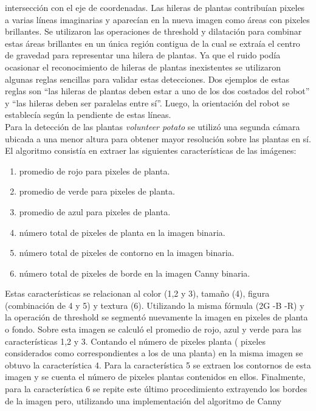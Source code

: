 	intersección con el eje de coordenadas. Las hileras de plantas 
	contribuían pixeles a varias líneas imaginarias y aparecían en la 
	nueva imagen como áreas con pixeles brillantes. Se utilizaron las 
	operaciones de threshold y dilatación para combinar estas áreas 
	brillantes en un única región contigua de la cual se 
	extraía el centro de gravedad para representar una hilera de 
	plantas. Ya que el ruido podía ocasionar el reconocimiento de 
	hileras de plantas inexistentes se utilizaron algunas reglas 
	sencillas para validar estas detecciones. Dos ejemplos de estas 
	reglas son ``las hileras de plantas deben estar a uno de los dos 
	costados del robot'' y ``las hileras deben ser paralelas entre sí''.
	Luego, la orientación del robot se establecía según la pendiente de 
	estas líneas.\\
	\indent Para la detección de las plantas \emph{volunteer potato} se 
	utilizó una segunda cámara ubicada a una menor altura para obtener 
	mayor resolución sobre las plantas en sí. El algoritmo consistía en 
	extraer las siguientes características de las imágenes: 
	\begin{enumerate}
	\item{promedio de rojo para pixeles de planta.}
	\item{promedio de verde para 
	pixeles de planta.}
	\item{promedio de azul para pixeles de planta.}
	\item{número total de pixeles de planta en la imagen binaria.}
	\item{número total de pixeles de contorno en la imagen binaria.}
	\item{número total de pixeles de borde en la imagen Canny binaria.}
	\end{enumerate} Estas 
	características se relacionan al color (1,2 y 3), tamaño (4), figura 
	(combinación de 4 y 5) y textura (6).  Utilizando la misma fórmula 
	(2G -B -R) y la operación de threshold se segmentó nuevamente la imagen 
	 en pixeles de planta o fondo. Sobre esta imagen se calculó el 
	 promedio de rojo, azul y verde para las características 1,2 y 3. 
	 Contando el número de pixeles planta ( pixeles considerados como 
	 correspondientes a los de una planta) en la misma 
	 imagen se obtuvo la característica 4. Para la característica 5 
	 se extraen los contornos de esta imagen y se cuenta el número de 
	 pixeles plantas contenidos en ellos. Finalmente, para la característica 6 se 
	 repite este último procedimiento extrayendo los bordes de la 
	 imagen pero,  
	 utilizando una implementación del algoritmo de Canny 
